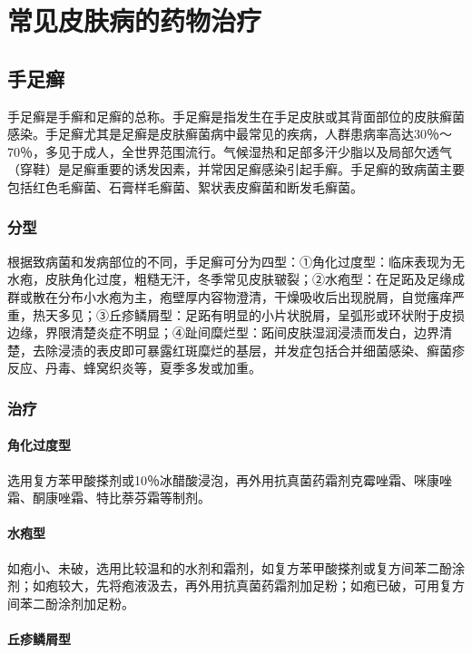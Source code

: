 \chapter{常见皮肤病的药物治疗}

\section{手足癣}

手足癣是手癣和足癣的总称。手足癣是指发生在手足皮肤或其背面部位的皮肤癣菌感染。手足癣尤其是足癣是皮肤癣菌病中最常见的疾病，人群患病率高达30％～70％，多见于成人，全世界范围流行。气候湿热和足部多汗少脂以及局部欠透气（穿鞋）是足癣重要的诱发因素，并常因足癣感染引起手癣。手足癣的致病菌主要包括红色毛癣菌、石膏样毛癣菌、絮状表皮癣菌和断发毛癣菌。

\subsection{分型}

根据致病菌和发病部位的不同，手足癣可分为四型：①角化过度型：临床表现为无水疱，皮肤角化过度，粗糙无汗，冬季常见皮肤皲裂；②水疱型：在足跖及足缘成群或散在分布小水疱为主，疱壁厚内容物澄清，干燥吸收后出现脱屑，自觉瘙痒严重，热天多见；③丘疹鳞屑型：足跖有明显的小片状脱屑，呈弧形或环状附于皮损边缘，界限清楚炎症不明显；④趾间糜烂型：跖间皮肤湿润浸渍而发白，边界清楚，去除浸渍的表皮即可暴露红斑糜烂的基层，并发症包括合并细菌感染、癣菌疹反应、丹毒、蜂窝织炎等，夏季多发或加重。

\subsection{治疗}

\subsubsection{角化过度型}

选用复方苯甲酸搽剂或10％冰醋酸浸泡，再外用抗真菌药霜剂克霉唑霜、咪康唑霜、酮康唑霜、特比萘芬霜等制剂。

\subsubsection{水疱型}

如疱小、未破，选用比较温和的水剂和霜剂，如复方苯甲酸搽剂或复方间苯二酚涂剂；如疱较大，先将疱液汲去，再外用抗真菌药霜剂加足粉；如疱已破，可用复方间苯二酚涂剂加足粉。

\subsubsection{丘疹鳞屑型}

